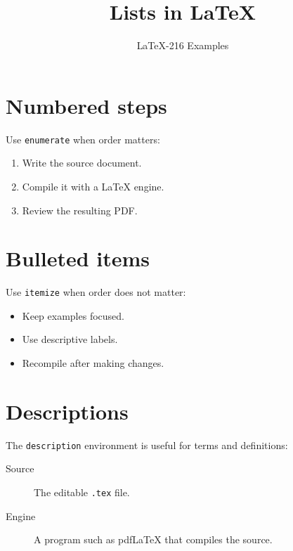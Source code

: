 \documentclass{article}
\title{Lists in LaTeX}
\author{LaTeX-216 Examples}
\date{}
\begin{document}
\maketitle

\section{Numbered steps}
Use \texttt{enumerate} when order matters:
\begin{enumerate}
  \item Write the source document.
  \item Compile it with a LaTeX engine.
  \item Review the resulting PDF.
\end{enumerate}

\section{Bulleted items}
Use \texttt{itemize} when order does not matter:
\begin{itemize}
  \item Keep examples focused.
  \item Use descriptive labels.
  \item Recompile after making changes.
\end{itemize}

\section{Descriptions}
The \texttt{description} environment is useful for terms and definitions:
\begin{description}
  \item[Source] The editable \texttt{.tex} file.
  \item[Engine] A program such as pdfLaTeX that compiles the source.
\end{description}
\end{document}
